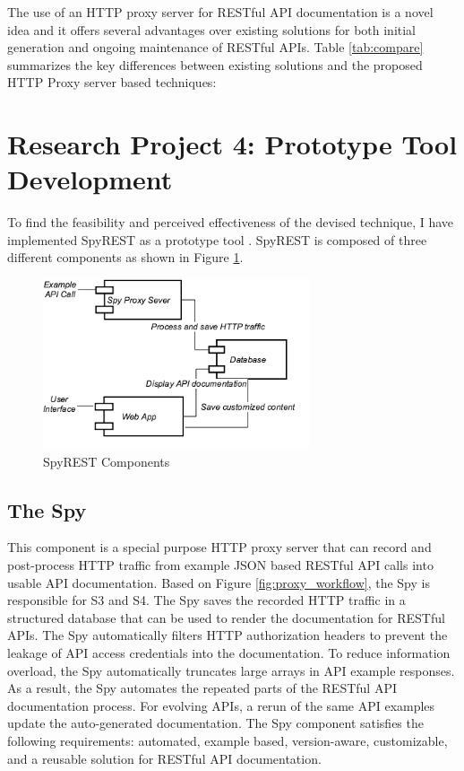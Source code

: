 \documentclass[11pt,oneside]{book}
\begin{document}
The use of an HTTP proxy server for RESTful API documentation is a novel idea and it offers several advantages over existing solutions for both initial generation and ongoing maintenance of RESTful APIs. Table \ref{tab:compare} summarizes the key differences between existing solutions and the proposed HTTP Proxy server based techniques:

\section{Research Project 4: Prototype Tool Development}

To find the feasibility and perceived effectiveness of the devised technique, I have implemented SpyREST as a prototype tool \cite{sohan2015spyrest_tool}. SpyREST is composed of three different components as shown in Figure \ref{fig:components}.

\begin{figure}[htb]
  \begin{center}
  \includegraphics[height=5cm,keepaspectratio]{spyrest_components.png}
  \end{center}
  \caption{SpyREST Components}
  \label{fig:components}
\end{figure}

\subsection{The Spy}
This component is a special purpose HTTP proxy server that can record and post-process HTTP traffic from example JSON based RESTful API calls into usable API documentation. Based on Figure \ref{fig:proxy_workflow}, the Spy is responsible for S3 and S4. The Spy saves the recorded HTTP traffic in a structured database that can be used to render the documentation for RESTful APIs. The Spy automatically filters HTTP authorization headers to prevent the leakage of API access credentials into the documentation. To reduce information overload, the Spy automatically truncates large arrays in API example responses. As a result, the Spy automates the repeated parts of the RESTful API documentation process. For evolving APIs, a rerun of the same API examples update the auto-generated documentation. The Spy component satisfies the following requirements: automated, example based, version-aware, customizable, and a reusable solution for RESTful API documentation.
\end{document}
